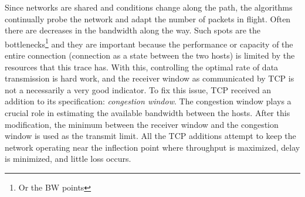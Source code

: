 Since networks are shared and conditions change along the path, the algorithms
continually probe the network and adapt the number of packets in flight. Often there are decreases in
the bandwidth along the way. Such spots are the bottlenecks\footnote{Or the \gls{BW}
points} and they are important because the performance or capacity of the
entire connection (connection as a state between the two hosts) is limited by
the resources that this trace has. With this, controlling the optimal rate of
data transmission is hard work, and the receiver window as communicated by
TCP is not a necessarily a very good indicator. To fix this issue, TCP
received an addition to its specification: \textit{congestion window}. The
congestion window plays a crucial role in estimating the available bandwidth
between the hosts. After this modification, the minimum between the receiver
window and the congestion window is used as the transmit limit. All the TCP
additions attempt to keep the network operating near the inflection point
where throughput is maximized, delay is minimized, and little loss occurs.
